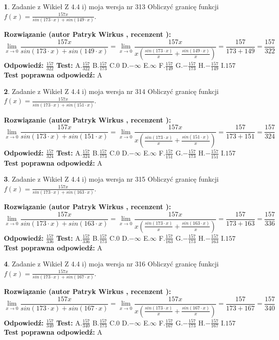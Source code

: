 \documentclass[12pt, a4paper]{article}
\theoremstyle{definition} %
\newtheorem{zad}{}
\newcommand{\zadStart}[1]{\begin{zad}#1\newline}
\newcommand{\zadStop}{\end{zad}}
\newcommand{\rozwStart}[2]{\noindent \textbf{Rozwiązanie (autor #1 , recenzent #2): }\newline}
\newcommand{\rozwStop}{\newline}
\newcommand{\odpStart}{\noindent \textbf{Odpowiedź:}\newline}
\newcommand{\odpStop}{\newline}
\newcommand{\testStart}{\noindent \textbf{Test:}\newline}
\newcommand{\testStop}{\newline}
\newcommand{\kluczStart}{\noindent \textbf{Test poprawna odpowiedź:}\newline}
\newcommand{\kluczStop}{\newline}
\begin{document}
\zadStart{Zadanie z Wikieł Z 4.4 i) moja wersja nr 313}
Obliczyć granicę funkcji $f(x)=\frac{157x}{sin(173\cdot x) +sin(149\cdot x)}$.
\zadStop
\rozwStart{Patryk Wirkus}{}
$$\lim\limits_{x\to 0}\frac{157x}{sin(173\cdot x) +sin(149\cdot x)}=\lim\limits_{x\to 0}\frac{157x}{x(\frac{sin(173\cdot x)}{x}+\frac{sin(149\cdot x)}{x})}=\frac{157}{173+149} = \frac{157}{322}$$
\rozwStop
\odpStart
$\frac{157}{322}$
\odpStop
\testStart
A.$\frac{157}{322}$
B.$\frac{157}{173}$
C.$0$
D.$-\infty$
E.$\infty$
F.$\frac{157}{149}$
G.$-\frac{157}{173}$
H.$-\frac{157}{149}$
I.$157$
\testStop
\kluczStart
A
\kluczStop



\zadStart{Zadanie z Wikieł Z 4.4 i) moja wersja nr 314}
Obliczyć granicę funkcji $f(x)=\frac{157x}{sin(173\cdot x) +sin(151\cdot x)}$.
\zadStop
\rozwStart{Patryk Wirkus}{}
$$\lim\limits_{x\to 0}\frac{157x}{sin(173\cdot x) +sin(151\cdot x)}=\lim\limits_{x\to 0}\frac{157x}{x(\frac{sin(173\cdot x)}{x}+\frac{sin(151\cdot x)}{x})}=\frac{157}{173+151} = \frac{157}{324}$$
\rozwStop
\odpStart
$\frac{157}{324}$
\odpStop
\testStart
A.$\frac{157}{324}$
B.$\frac{157}{173}$
C.$0$
D.$-\infty$
E.$\infty$
F.$\frac{157}{151}$
G.$-\frac{157}{173}$
H.$-\frac{157}{151}$
I.$157$
\testStop
\kluczStart
A
\kluczStop



\zadStart{Zadanie z Wikieł Z 4.4 i) moja wersja nr 315}
Obliczyć granicę funkcji $f(x)=\frac{157x}{sin(173\cdot x) +sin(163\cdot x)}$.
\zadStop
\rozwStart{Patryk Wirkus}{}
$$\lim\limits_{x\to 0}\frac{157x}{sin(173\cdot x) +sin(163\cdot x)}=\lim\limits_{x\to 0}\frac{157x}{x(\frac{sin(173\cdot x)}{x}+\frac{sin(163\cdot x)}{x})}=\frac{157}{173+163} = \frac{157}{336}$$
\rozwStop
\odpStart
$\frac{157}{336}$
\odpStop
\testStart
A.$\frac{157}{336}$
B.$\frac{157}{173}$
C.$0$
D.$-\infty$
E.$\infty$
F.$\frac{157}{163}$
G.$-\frac{157}{173}$
H.$-\frac{157}{163}$
I.$157$
\testStop
\kluczStart
A
\kluczStop



\zadStart{Zadanie z Wikieł Z 4.4 i) moja wersja nr 316}
Obliczyć granicę funkcji $f(x)=\frac{157x}{sin(173\cdot x) +sin(167\cdot x)}$.
\zadStop
\rozwStart{Patryk Wirkus}{}
$$\lim\limits_{x\to 0}\frac{157x}{sin(173\cdot x) +sin(167\cdot x)}=\lim\limits_{x\to 0}\frac{157x}{x(\frac{sin(173\cdot x)}{x}+\frac{sin(167\cdot x)}{x})}=\frac{157}{173+167} = \frac{157}{340}$$
\rozwStop
\odpStart
$\frac{157}{340}$
\odpStop
\testStart
A.$\frac{157}{340}$
B.$\frac{157}{173}$
C.$0$
D.$-\infty$
E.$\infty$
F.$\frac{157}{167}$
G.$-\frac{157}{173}$
H.$-\frac{157}{167}$
I.$157$
\testStop
\kluczStart
A
\kluczStop
\end{document}

